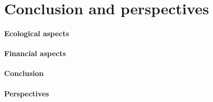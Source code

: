 \chapter{Conclusion and perspectives}
\subsubsection{Ecological aspects}
\subsubsection{Financial aspects}
\subsubsection{Conclusion}
\subsubsection{Perspectives}
